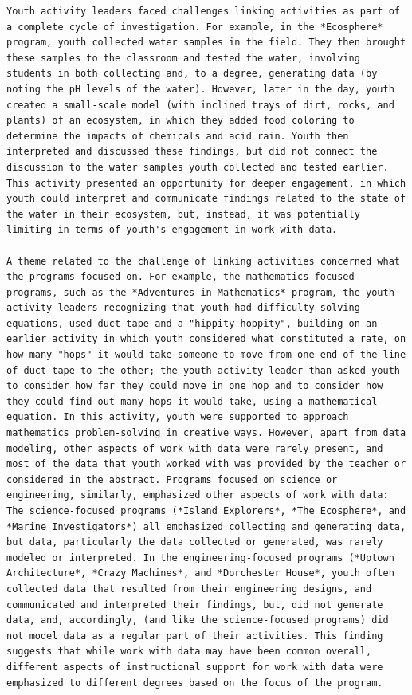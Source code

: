 \documentclass[]{book}
\theoremstyle{definition}
\theoremstyle{definition}
\theoremstyle{definition}
\theoremstyle{remark}
\begin{document}
\begin{verbatim}
Youth activity leaders faced challenges linking activities as part of a complete cycle of investigation. For example, in the *Ecosphere* program, youth collected water samples in the field. They then brought these samples to the classroom and tested the water, involving students in both collecting and, to a degree, generating data (by noting the pH levels of the water). However, later in the day, youth created a small-scale model (with inclined trays of dirt, rocks, and plants) of an ecosystem, in which they added food coloring to determine the impacts of chemicals and acid rain. Youth then interpreted and discussed these findings, but did not connect the discussion to the water samples youth collected and tested earlier. This activity presented an opportunity for deeper engagement, in which youth could interpret and communicate findings related to the state of the water in their ecosystem, but, instead, it was potentially limiting in terms of youth's engagement in work with data.

A theme related to the challenge of linking activities concerned what the programs focused on. For example, the mathematics-focused programs, such as the *Adventures in Mathematics* program, the youth activity leaders recognizing that youth had difficulty solving equations, used duct tape and a "hippity hoppity", building on an earlier activity in which youth considered what constituted a rate, on how many "hops" it would take someone to move from one end of the line of duct tape to the other; the youth activity leader than asked youth to consider how far they could move in one hop and to consider how they could find out many hops it would take, using a mathematical equation. In this activity, youth were supported to approach mathematics problem-solving in creative ways. However, apart from data modeling, other aspects of work with data were rarely present, and most of the data that youth worked with was provided by the teacher or considered in the abstract. Programs focused on science or engineering, similarly, emphasized other aspects of work with data: The science-focused programs (*Island Explorers*, *The Ecosphere*, and *Marine Investigators*) all emphasized collecting and generating data, but data, particularly the data collected or generated, was rarely modeled or interpreted. In the engineering-focused programs (*Uptown Architecture*, *Crazy Machines*, and *Dorchester House*, youth often collected data that resulted from their engineering designs, and communicated and interpreted their findings, but, did not generate data, and, accordingly, (and like the science-focused programs) did not model data as a regular part of their activities. This finding suggests that while work with data may have been common overall, different aspects of instructional support for work with data were emphasized to different degrees based on the focus of the program.


\end{verbatim}
\end{document}
